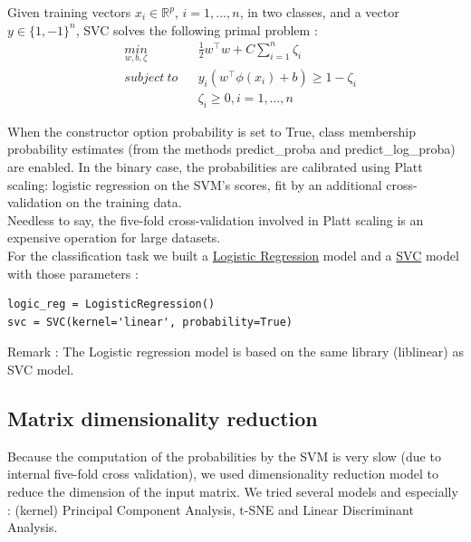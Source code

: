 		Given training vectors $x_i \in \mathbb{R}^p$, $i=1,..., n$, in two classes, and a vector $y \in \{1, -1\}^n$, SVC solves the following primal problem :
		\begin{equation*}
			\begin{aligned}
				& \underset{w,b,\zeta}{min}
				& & \frac{1}{2}w^\intercal w+C\sum_{i=1}^{n}\zeta_i \\
				& subject~to
				& & y_i(w^\intercal \phi(x_i)+b) \geq 1-\zeta_i\\
				& & & \zeta_i \geq 0,i=1,\ldots,n
			\end{aligned}
		\end{equation*}

		When the constructor option probability is set to True, class membership probability estimates (from the methods predict\_proba and predict\_log\_proba) are enabled. In the binary case, the probabilities are calibrated using Platt scaling: logistic regression on the SVM’s scores, fit by an additional cross-validation on the training data.\\

		Needless to say, the five-fold cross-validation involved in Platt scaling is an expensive operation for large datasets.\\

		For the classification task we built a \href{http://scikit-learn.org/stable/modules/generated/sklearn.linear_model.LogisticRegression.html#sklearn.linear_model.LogisticRegression}{Logistic Regression} model and a \href{http://scikit-learn.org/stable/modules/generated/sklearn.svm.SVC.html#sklearn.svm.SVC}{SVC} model with those parameters :
		\begin{verbatim}
logic_reg = LogisticRegression()
svc = SVC(kernel='linear', probability=True)
		\end{verbatim}
		Remark : The Logistic regression model is based on the same library (liblinear) as SVC model.

	\subsection{Matrix dimensionality reduction}
		Because the computation of the probabilities by the SVM is very slow (due to internal five-fold cross validation), we used dimensionality reduction model to reduce the dimension of the input matrix. We tried several models and especially : (kernel) Principal Component Analysis, t-SNE and Linear Discriminant Analysis.\\

